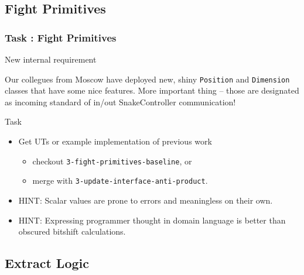 \documentclass[english]{beamer}
\newenvironment{narrowblock}[1]{%
\begin{center}
\begin{minipage}{10.5cm}
\begin{block}{#1}
}{%
\end{block}
\end{minipage}
\end{center}
}
\begin{document}
\subsection{Fight Primitives}

\begin{frame}
\frametitle{Task \thesubsection: Fight Primitives}

\begin{narrowblock}{New internal  requirement}
Our collegues from Moscow have deployed new, shiny \texttt{Position} and \texttt{Dimension} classes that have some nice features. More important thing -- those are designated as incoming standard of in/out SnakeController communication!
\end{narrowblock}

\pause
\begin{narrowblock}{Task}
\begin{itemize}[<+->]
 \item Get UTs or example implementation of previous work
 \begin{itemize}[<+->]
  \item checkout \texttt{3-fight-primitives-baseline}, or
  \item merge with \texttt{3-update-interface-anti-product}.
 \end{itemize}
\item HINT: Scalar values are prone to errors and meaningless on their own. 
\item HINT: Expressing programmer thought in domain language is better than obscured bitshift calculations.
\end{itemize}
\end{narrowblock}
\end{frame}

\subsection{Extract Logic}
\end{document}
